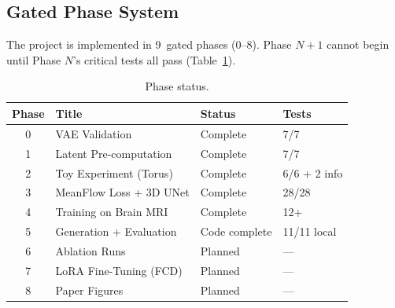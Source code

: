 \subsection{Gated Phase System}

The project is implemented in 9~gated phases (0--8).  Phase $N{+}1$ cannot
begin until Phase $N$'s critical tests all pass (Table~\ref{tab:phases}).

\begin{table}[ht]
\centering
\caption{Phase status.}
\label{tab:phases}
\begin{tabular}{clll}
\toprule
\textbf{Phase} & \textbf{Title} & \textbf{Status} & \textbf{Tests} \\
\midrule
0 & VAE Validation         & Complete      & 7/7 \\
1 & Latent Pre-computation & Complete      & 7/7 \\
2 & Toy Experiment (Torus) & Complete      & 6/6 + 2 info \\
3 & MeanFlow Loss + 3D UNet & Complete    & 28/28 \\
4 & Training on Brain MRI  & Complete      & 12+ \\
5 & Generation + Evaluation & Code complete & 11/11 local \\
6 & Ablation Runs          & Planned       & --- \\
7 & LoRA Fine-Tuning (FCD) & Planned       & --- \\
8 & Paper Figures          & Planned       & --- \\
\bottomrule
\end{tabular}
\end{table}
